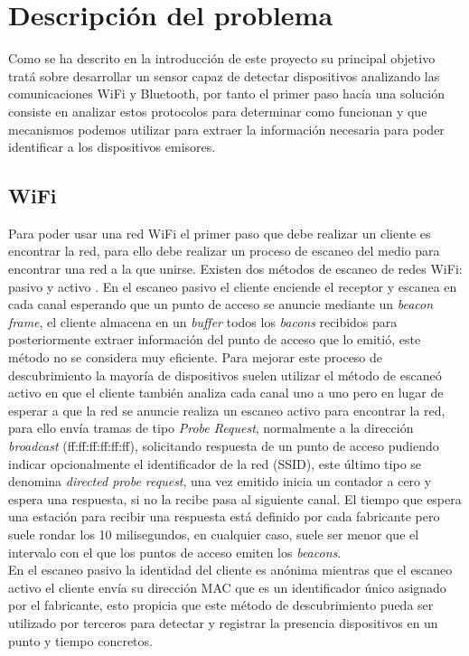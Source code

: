 \documentclass[../proyecto.tex]{subfiles}
\begin{document}
\chapter{Descripción del problema}\label{chap:descripcion_problema}

Como se ha descrito en la introducción de este proyecto su principal objetivo tratá sobre desarrollar un sensor capaz de detectar dispositivos analizando las comunicaciones WiFi y Bluetooth, por tanto el primer paso hacía una solución consiste en analizar estos protocolos para determinar como funcionan y que mecanismos podemos utilizar para extraer la información necesaria para poder identificar a los dispositivos emisores.

\section{WiFi}

Para poder usar una red WiFi el primer paso que debe realizar un cliente es encontrar la red, para ello debe realizar un proceso de escaneo del medio para encontrar una red a la que unirse. Existen dos métodos de escaneo de redes WiFi: pasivo y activo \cite{ieee80211_2016}. En el escaneo pasivo el cliente enciende el receptor y escanea en cada canal esperando que un punto de acceso se anuncie mediante un \textit{beacon frame}, el cliente almacena en un \textit{buffer} todos los \textit{bacons} recibidos para posteriormente extraer información del punto de acceso que lo emitió, este método no se considera muy eficiente. Para mejorar este proceso de descubrimiento la mayoría de dispositivos suelen utilizar el método de escaneó activo en que el cliente también analiza cada canal uno a uno pero en lugar de esperar a que la red se anuncie realiza un escaneo activo para encontrar la red, para ello envía tramas de tipo \textit{Probe Request}, normalmente a la dirección \textit{broadcast} (ff:ff:ff:ff:ff:ff), solicitando respuesta de un punto de acceso pudiendo indicar opcionalmente el identificador de la red (SSID), este último tipo se denomina \textit{directed probe request}, una vez emitido inicia un contador a cero y espera una respuesta, si no la recibe pasa al siguiente canal. El tiempo que espera una estación para recibir una respuesta está definido por cada fabricante pero suele rondar los 10 milisegundos, en cualquier caso, suele ser menor que el intervalo con el que los puntos de acceso emiten los \textit{beacons}.\\

En el escaneo pasivo la identidad del cliente es anónima mientras que el escaneo activo el cliente envía su dirección MAC que es un identificador único asignado por el fabricante, esto propicia que este método de descubrimiento pueda ser utilizado por terceros para detectar y registrar la presencia dispositivos en un punto y tiempo concretos.\\
\end{document}
